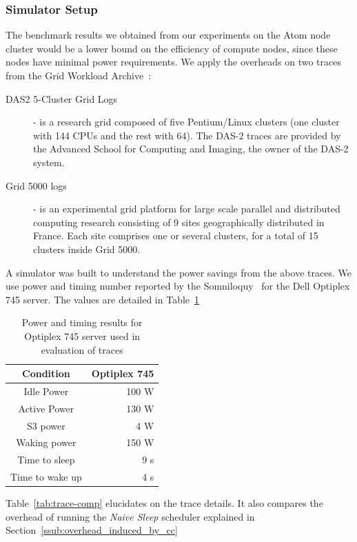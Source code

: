 \subsubsection{Simulator Setup} %
\label{sub:trace_driven_simulation}
The benchmark results we obtained from our experiments on the Atom node cluster would be a lower bound on the efficiency of compute nodes, since these nodes have minimal power requirements. We apply the overheads on two traces from the Grid Workload Archive~\cite{gwa}:
\begin{description}
    \item[DAS2 5-Cluster Grid Logs] - is a research grid composed of five Pentium/Linux clusters (one cluster with 144 CPUs and the rest with 64). The DAS-2 traces are provided by the Advanced School for Computing and Imaging, the owner of the DAS-2 system.
    \item[Grid 5000 logs] - is an experimental grid platform for large scale parallel and distributed computing research consisting of 9 sites geographically distributed in France. Each site comprises one or  several clusters, for a total of 15 clusters inside Grid 5000.
\end{description}

A simulator was built to understand the power savings from the above traces. We use power and timing number reported by the Somniloquy~\cite{Yuvraj:09} for the Dell Optiplex 745 server. The values are detailed in Table~\ref{tab:optiplex}
\begin{table}[tp]
    \label{tab:optiplex}
    \centering
    \begin{tabular}{|c|r|}
        \hline
        {\bf Condition} & {\bf Optiplex 745}\\
        \hline
        Idle Power & 100 W\\
        \hline
        Active Power & 130 W\\
        \hline
        S3 power & 4 W\\
        \hline
        Waking power & 150 W\\
        \hline
        Time to sleep & 9 s\\
        \hline
        Time to wake up & 4 s\\
        \hline
    \end{tabular}
    \caption{Power and timing results for Optiplex 745 server used in evaluation of traces}
\end{table}

Table~\ref{tab:trace-comp} elucidates on the trace details. It also compares the overhead of running the \emph{Naive Sleep} scheduler explained in Section~\ref{ssub:overhead_induced_by_cc}

